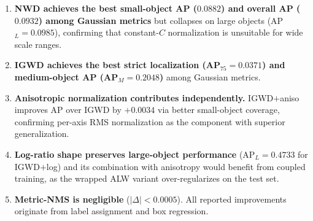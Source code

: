 \begin{enumerate}
  \item \textbf{NWD achieves the best small-object AP ($0.0882$) and overall
  AP ($0.0932$) among Gaussian metrics} but collapses on large objects
  (AP$_{L}=0.0985$), confirming that constant-$C$ normalization is
  unsuitable for wide scale ranges.

  \item \textbf{IGWD achieves the best strict localization (AP$_{75}=0.0371$)
  and medium-object AP (AP$_{M}=0.2048$)} among Gaussian metrics.

  \item \textbf{Anisotropic normalization contributes independently.}
  IGWD$+$aniso improves AP over IGWD by $+0.0034$ via better small-object
  coverage, confirming per-axis RMS normalization as the component with
  superior generalization.

  \item \textbf{Log-ratio shape preserves large-object performance}
  (AP$_{L}=0.4733$ for IGWD$+$log) and its combination with anisotropy
  would benefit from coupled training, as the wrapped ALW variant
  over-regularizes on the test set.

  \item \textbf{Metric-NMS is negligible} ($|\Delta|<0.0005$). All
  reported improvements originate from label assignment and box regression.
\end{enumerate}
